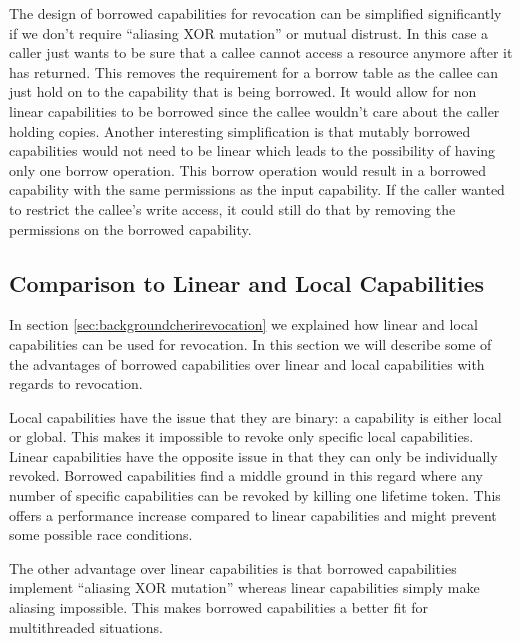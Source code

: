 The design of borrowed capabilities for revocation can be simplified significantly if we don't require ``aliasing XOR mutation'' or mutual distrust.
In this case a caller just wants to be sure that a callee cannot access a resource anymore after it has returned.
This removes the requirement for a borrow table as the callee can just hold on to the capability that is being borrowed.
It would allow for non linear capabilities to be borrowed since the callee wouldn't care about the caller holding copies.
Another interesting simplification is that mutably borrowed capabilities would not need to be linear which leads to the possibility of having only one borrow operation.
This borrow operation would result in a borrowed capability with the same permissions as the input capability.
If the caller wanted to restrict the callee's write access, it could still do that by removing the permissions on the borrowed capability.

\subsection{Comparison to Linear and Local Capabilities}
In section \ref{sec:backgroundcherirevocation} we explained how linear and local capabilities can be used for revocation.
In this section we will describe some of the advantages of borrowed capabilities over linear and local capabilities with regards to revocation.

Local capabilities have the issue that they are binary: a capability is either local or global.
This makes it impossible to revoke only specific local capabilities.
Linear capabilities have the opposite issue in that they can only be individually revoked.
Borrowed capabilities find a middle ground in this regard where any number of specific capabilities can be revoked by killing one lifetime token.
This offers a performance increase compared to linear capabilities and might prevent some possible race conditions.

The other advantage over linear capabilities is that borrowed capabilities implement ``aliasing XOR mutation'' whereas linear capabilities simply make aliasing impossible.
This makes borrowed capabilities a better fit for multithreaded situations.
